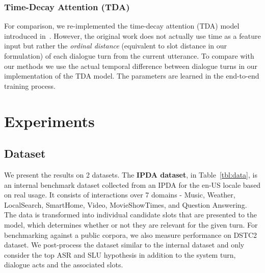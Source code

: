 \documentclass[11pt,a4paper]{article}
\begin{document}
\subsubsection{Time-Decay Attention (TDA)}
\label{sssec:tda}

For comparison, we re-implemented the time-decay attention (TDA) model introduced in~\cite{su2018time}. However, the original work does not actually use time as a feature input but rather the \textit{ordinal distance} (equivalent to slot distance in our formulation) of each dialogue turn from the current utterance. To compare with our methods we use the actual temporal difference between dialogue turns in our implementation of the TDA model. The parameters are learned in the end-to-end training process. 
\section{Experiments}
\label{sec:experiments}
\subsection{Dataset}
\label{ssec:dataset}
We present the results on 2 datasets. The {\bf IPDA dataset}, in  Table~\ref{tbl:data}, is an internal benchmark dataset collected from an IPDA for the en-US locale based on real usage. It consists of interactions over 7 domains - Music, Weather, LocalSearch, SmartHome, Video, MovieShowTimes, and Question Answering.
The data is transformed into individual candidate slots that are presented to the model, which determines whether or not they are relevant for the given turn.
For benchmarking against a public corpora, we also measure performance on DSTC2~\cite{henderson2014second} dataset.
We post-process the dataset similar to the internal dataset and only consider the top ASR and SLU hypothesis in addition to the system turn, dialogue acts and the associated slots.
\end{document}
